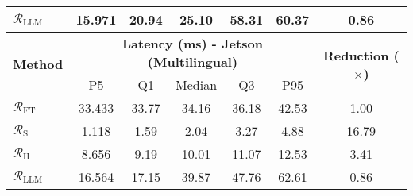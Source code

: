 \begin{table}[t]
\begin{tabular}{lcccccc}
$\mathcal{R}_\text{LLM}$ & 15.971 & 20.94 & 25.10 & 58.31 & 60.37 & 0.86 \\ %
\midrule
\multirow{2}{*}{\textbf{Method}} 
& \multicolumn{5}{c}{\textbf{Latency (ms) - Jetson (Multilingual)}} & \multirow{2}{*}{\textbf{Reduction ($\times$)}} \\
\cmidrule(lr){2-6}
& P5 & Q1 & Median & Q3 & P95 & \\
\midrule
$\mathcal{R}_\text{FT}$ & 33.433 & 33.77 & 34.16 & 36.18 & 42.53 & 1.00 \\ %
$\mathcal{R}_\text{S}$ & 1.118 & 1.59 & 2.04 & 3.27 & 4.88 & 16.79 \\ %
$\mathcal{R}_\text{H}$ & 8.656 & 9.19 & 10.01 & 11.07 & 12.53 & 3.41 \\ %
$\mathcal{R}_\text{LLM}$ & 16.564 & 17.15 & 39.87 & 47.76 & 62.61 & 0.86 \\ %
\bottomrule
\end{tabular}
\vspace{-2mm} %
\end{table}
